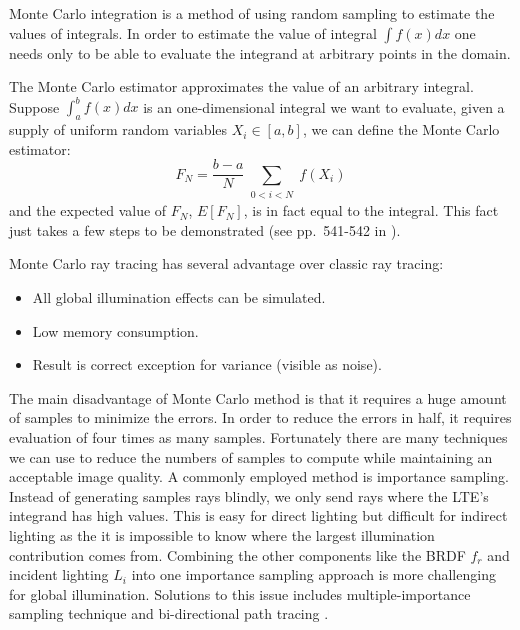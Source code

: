 Monte Carlo integration is a method of using random sampling to estimate the values of integrals. In order to estimate the value of integral \( \int f(x)dx \) one needs only to be able to evaluate the integrand at arbitrary points in the domain.

The Monte Carlo estimator approximates the value of an arbitrary integral. Suppose \( \int_{a}^{b}f(x)dx \) is an one-dimensional integral we want to evaluate, given a supply of uniform random variables \( X_{i} \in [a, b] \), we can define the Monte Carlo estimator:
\begin{equation}
F_{N} = \frac{b-a}{N}\sum_{\substack{0<i<N}}f(X_{i})
\end{equation}
and the expected value of \(F_{N}\), \(E[F_{N}]\), is in fact equal to the integral. This fact just takes a few steps to be demonstrated (see pp.~541-542 in \cite{Pharr:2010:PBR:1854996}).

Monte Carlo ray tracing has several advantage over classic ray tracing:
\begin{itemize}

\item All global illumination effects can be simulated.

\item Low memory consumption.

\item Result is correct exception for variance (visible as noise).

\end{itemize}

The main disadvantage of Monte Carlo method is that it requires a huge amount of samples to minimize the errors. In order to reduce the errors in half, it requires evaluation of four times as many samples. Fortunately there are many techniques we can use to reduce the numbers of samples to compute while maintaining an acceptable image quality. A commonly employed method is importance sampling. Instead of generating samples rays blindly, we only send rays where the LTE's integrand has high values. This is easy for direct lighting but difficult for indirect lighting as the it is impossible to know where the largest illumination contribution comes from. Combining the other components like the BRDF \(f_{r}\) and incident lighting \(L_{i}\) into one importance sampling approach is more challenging for global illumination. Solutions to this issue includes multiple-importance sampling technique and bi-directional path tracing \cite{Lafortune93bi-directionalpath}.

